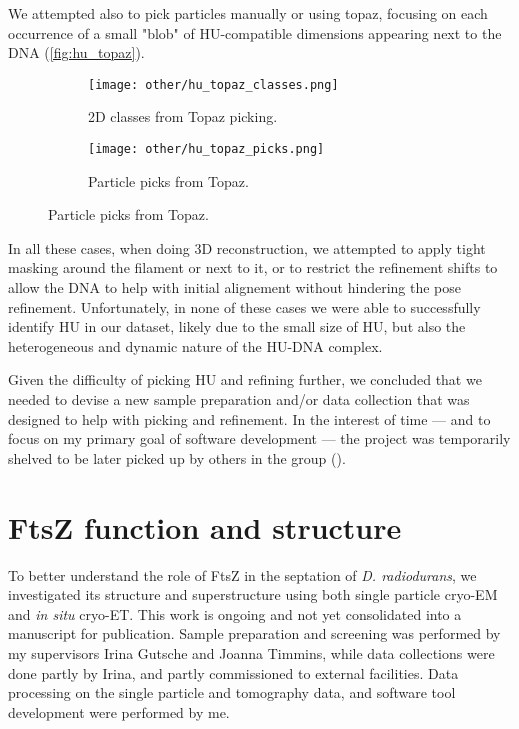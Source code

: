 We attempted also to pick particles manually or using topaz, focusing on each occurrence of a small "blob" of HU-compatible dimensions appearing next to the DNA (\autoref{fig:hu_topaz}).

\begin{figure}
    \centering
    \begin{subfigure}[B]{.49\textwidth}
        \centering
        \texttt{[image: other/hu\_topaz\_classes.png]}
        \caption{2D classes from Topaz picking.}
        \label{fig:hu_topaz_classes}
    \end{subfigure}%
    \hfill
    \begin{subfigure}[B]{.49\textwidth}
        \centering
        \texttt{[image: other/hu\_topaz\_picks.png]}
        \caption{Particle picks from Topaz.}
        \label{fig:hu_topaz_picks}
    \end{subfigure}%
    \label{fig:hu_topaz}
\end{figure}

In all these cases, when doing 3D reconstruction, we attempted to apply tight masking around the filament or next to it, or to restrict the refinement shifts to allow the DNA to help with initial alignement without hindering the pose refinement.
Unfortunately, in none of these cases we were able to successfully identify HU in our dataset, likely due to the small size of HU, but also the heterogeneous and dynamic nature of the HU-DNA complex.

Given the difficulty of picking HU and refining further, we concluded that we needed to devise a new sample preparation and/or data collection that was designed to help with picking and refinement.
In the interest of time --- and to focus on my primary goal of software development --- the project was temporarily shelved to be later picked up by others in the group ().


\section{FtsZ function and structure}\label{ftsz}

To better understand the role of FtsZ in the septation of \textit{D. radiodurans}, we investigated its structure and superstructure using both single particle cryo-EM and \textit{in situ} cryo-ET.
This work is ongoing and not yet consolidated into a manuscript for publication.
Sample preparation and screening was performed by my supervisors Irina Gutsche and Joanna Timmins, while data collections were done partly by Irina, and partly commissioned to external facilities.
Data processing on the single particle and tomography data, and software tool development were performed by me.

